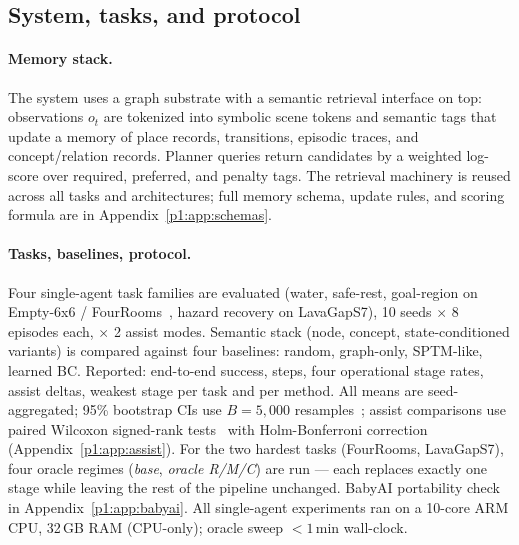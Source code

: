 \documentclass{article}
\begin{document}
\subsection{System, tasks, and protocol}
\label{p1:sec:single-setup}

\paragraph{Memory stack.}
The system uses a graph substrate with a semantic retrieval interface on top: observations $o_t$ are tokenized into symbolic scene tokens and semantic tags that update a memory of place records, transitions, episodic traces, and concept/relation records. Planner queries return candidates by a weighted log-score over required, preferred, and penalty tags. The retrieval machinery is reused across all tasks and architectures; full memory schema, update rules, and scoring formula are in Appendix~\ref{p1:app:schemas}.

\paragraph{Tasks, baselines, protocol.}
Four single-agent task families are evaluated (water, safe-rest, goal-region on Empty-6x6 / FourRooms~\citep{sutton1999between}, hazard recovery on LavaGapS7), 10 seeds $\times$ 8 episodes each, $\times$ 2 assist modes. Semantic stack (node, concept, state-conditioned variants) is compared against four baselines: random, graph-only, SPTM-like, learned BC. Reported: end-to-end success, steps, four operational stage rates, assist deltas, weakest stage per task and per method. All means are seed-aggregated; 95\% bootstrap CIs use $B{=}5{,}000$ resamples~\citep{efron1979bootstrap}; assist comparisons use paired Wilcoxon signed-rank tests~\citep{wilcoxon1945individual} with Holm-Bonferroni correction~\citep{holm1979simple} (Appendix~\ref{p1:app:assist}). For the two hardest tasks (FourRooms, LavaGapS7), four oracle regimes (\emph{base}, \emph{oracle R/M/C}) are run — each replaces exactly one stage while leaving the rest of the pipeline unchanged. BabyAI portability check in Appendix~\ref{p1:app:babyai}. All single-agent experiments ran on a 10-core ARM CPU, 32\,GB RAM (CPU-only); oracle sweep $<1$\,min wall-clock.
\end{document}
